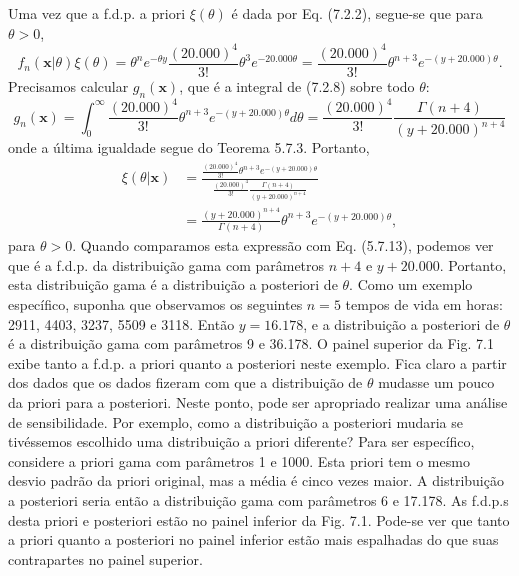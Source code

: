 Uma vez que a f.d.p. a priori $\xi(\theta)$ é dada por Eq. (7.2.2), segue-se que para $\theta > 0$,
\begin{equation}
f_n(\mathbf{x}|\theta)\xi(\theta) = \theta^n e^{-\theta y} \frac{(20.000)^4}{3!} \theta^3 e^{-20.000\theta} = \frac{(20.000)^4}{3!} \theta^{n+3} e^{-(y+20.000)\theta}. \tag{7.2.8}
\end{equation}
Precisamos calcular $g_n(\mathbf{x})$, que é a integral de (7.2.8) sobre todo $\theta$:
$$ g_n(\mathbf{x}) = \int_0^{\infty} \frac{(20.000)^4}{3!} \theta^{n+3} e^{-(y+20.000)\theta} d\theta = \frac{(20.000)^4}{3!} \frac{\Gamma(n+4)}{(y+20.000)^{n+4}} $$
onde a última igualdade segue do Teorema 5.7.3. Portanto,
\begin{align}
\xi(\theta|\mathbf{x}) &= \frac{\frac{(20.000)^4}{3!} \theta^{n+3} e^{-(y+20.000)\theta}}{\frac{(20.000)^4}{3!} \frac{\Gamma(n+4)}{(y+20.000)^{n+4}}} \nonumber \\
&= \frac{(y+20.000)^{n+4}}{\Gamma(n+4)}\theta^{n+3}e^{-(y+20.000)\theta}, \tag{7.2.9}
\end{align}
para $\theta > 0$. Quando comparamos esta expressão com Eq. (5.7.13), podemos ver que é a f.d.p. da distribuição gama com parâmetros $n+4$ e $y+20.000$. Portanto, esta distribuição gama é a distribuição a posteriori de $\theta$.
Como um exemplo específico, suponha que observamos os seguintes $n=5$ tempos de vida em horas: 2911, 4403, 3237, 5509 e 3118. Então $y=16.178$, e a distribuição a posteriori de $\theta$ é a distribuição gama com parâmetros 9 e 36.178. O painel superior da Fig. 7.1 exibe tanto a f.d.p. a priori quanto a posteriori neste exemplo. Fica claro a partir dos dados que os dados fizeram com que a distribuição de $\theta$ mudasse um pouco da priori para a posteriori.
Neste ponto, pode ser apropriado realizar uma análise de sensibilidade. Por exemplo, como a distribuição a posteriori mudaria se tivéssemos escolhido uma distribuição a priori diferente? Para ser específico, considere a priori gama com parâmetros 1 e 1000. Esta priori tem o mesmo desvio padrão da priori original, mas a média é cinco vezes maior. A distribuição a posteriori seria então a distribuição gama com parâmetros 6 e 17.178. As f.d.p.s desta priori e posteriori estão no painel inferior da Fig. 7.1. Pode-se ver que tanto a priori quanto a posteriori no painel inferior estão mais espalhadas do que suas contrapartes no painel superior.

